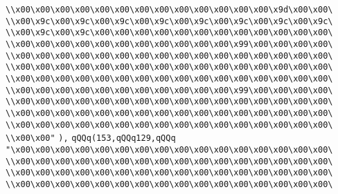 \verb|\\x00\x00\x00\x00\x00\x00\x00\x00\x00\x00\x00\x00\x00\x9d\x00\x00\|\newline
\verb|\\x00\x9c\x00\x9c\x00\x9c\x00\x9c\x00\x9c\x00\x9c\x00\x9c\x00\x9c\|\newline
\verb|\\x00\x9c\x00\x9c\x00\x00\x00\x00\x00\x00\x00\x00\x00\x00\x00\x00\|\newline
\verb|\\x00\x00\x00\x00\x00\x00\x00\x00\x00\x00\x00\x99\x00\x00\x00\x00\|\newline
\verb|\\x00\x00\x00\x00\x00\x00\x00\x00\x00\x00\x00\x00\x00\x00\x00\x00\|\newline
\verb|\\x00\x00\x00\x00\x00\x00\x00\x00\x00\x00\x00\x00\x00\x00\x00\x00\|\newline
\verb|\\x00\x00\x00\x00\x00\x00\x00\x00\x00\x00\x00\x00\x00\x00\x00\x00\|\newline
\verb|\\x00\x00\x00\x00\x00\x00\x00\x00\x00\x00\x00\x99\x00\x00\x00\x00\|\newline
\verb|\\x00\x00\x00\x00\x00\x00\x00\x00\x00\x00\x00\x00\x00\x00\x00\x00\|\newline
\verb|\\x00\x00\x00\x00\x00\x00\x00\x00\x00\x00\x00\x00\x00\x00\x00\x00\|\newline
\verb|\\x00\x00\x00\x00\x00\x00\x00\x00\x00\x00\x00\x00\x00\x00\x00\x00\|\newline
\verb|\\x00\x00"|\newline
\verb|),|\newline
\verb|qQQq(153,qQQq129,qQQq|\newline
\verb|"\x00\x00\x00\x00\x00\x00\x00\x00\x00\x00\x00\x00\x00\x00\x00\x00\|\newline
\verb|\\x00\x00\x00\x00\x00\x00\x00\x00\x00\x00\x00\x00\x00\x00\x00\x00\|\newline
\verb|\\x00\x00\x00\x00\x00\x00\x00\x00\x00\x00\x00\x00\x00\x00\x00\x00\|\newline
\verb|\\x00\x00\x00\x00\x00\x00\x00\x00\x00\x00\x00\x00\x00\x00\x00\x00\|\newline
